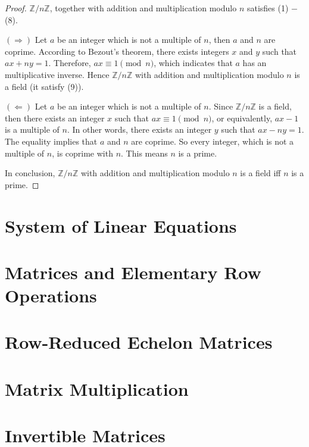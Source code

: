 \begin{proof}
    $\mathbb{Z}/n\mathbb{Z}$, together with addition and multiplication modulo $n$ satisfies (1) $-$ (8).

    $(\Rightarrow)$ Let $a$ be an integer which is not a multiple of $n$, then $a$ and $n$ are coprime. According to Bezout's theorem, there exists integers $x$ and $y$ such that $ax + ny = 1$. Therefore, $ax\equiv 1\pmod{n}$, which indicates that $a$ has an multiplicative inverse. Hence $\mathbb{Z}/n\mathbb{Z}$ with addition and multiplication modulo $n$ is a field (it satisfy (9)).

    $(\Leftarrow)$ Let $a$ be an integer which is not a multiple of $n$. Since $\mathbb{Z}/n\mathbb{Z}$ is a field, then there exists an integer $x$ such that $ax\equiv 1\pmod{n}$, or equivalently, $ax - 1$ is a multiple of $n$. In other words, there exists an integer $y$ such that $ax - ny = 1$. The equality implies that $a$ and $n$ are coprime. So every integer, which is not a multiple of $n$, is coprime with $n$. This means $n$ is a prime.

    In conclusion, $\mathbb{Z}/n\mathbb{Z}$ with addition and multiplication modulo $n$ is a field iff $n$ is a prime.
\end{proof}

\begin{definition}
\end{definition}

\section{System of Linear Equations}

\section{Matrices and Elementary Row Operations}

\section{Row-Reduced Echelon Matrices}

\section{Matrix Multiplication}

\section{Invertible Matrices}

